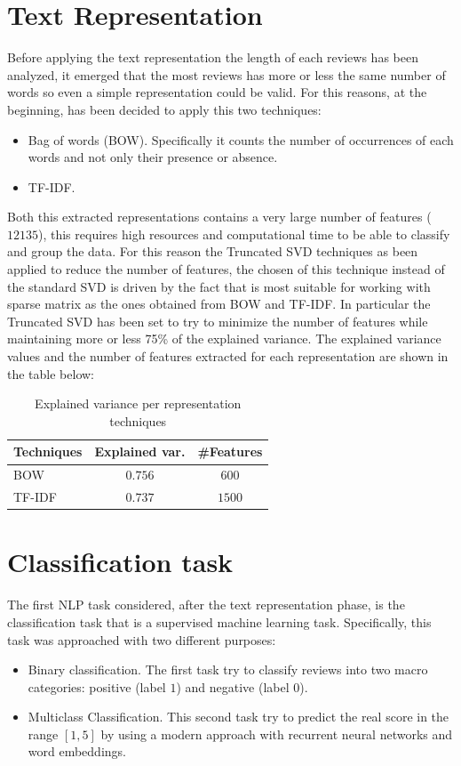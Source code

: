 \documentclass[11pt]{article}
\begin{document}
\section{Text Representation}
Before applying the text representation the length of each reviews has been analyzed, it emerged that the most reviews has more or less the same number of words so even a simple representation could be valid. For this reasons, at the beginning, has been decided to apply this two techniques:
\begin{itemize}
    \item Bag of words (BOW). Specifically it counts the number of occurrences of each words and not only their presence or absence.
    \item TF-IDF. 
\end{itemize}
Both this extracted representations contains a very large number of features ($12135$), this requires high resources and computational time to be able to classify and group the data. For this reason the Truncated SVD techniques as been applied to reduce the number of features, the chosen of this technique instead of the standard SVD is driven by the fact that is most suitable for working with sparse matrix as the ones obtained from BOW and TF-IDF. In particular the Truncated SVD has been set to try to minimize the number of features while maintaining more or less 75\% of the explained variance.
The explained variance values and the number of features extracted for each representation are shown in the table below:
\begin{table}[H]
    \begin{center}
        \begin{tabular}{||l||c|c||}
            \hline
            Techniques & Explained var. & \#Features\\
            \hline
            \hline
            BOW & $0.756$ & $600$\\
            \hline
            TF-IDF & $0.737$ & $1500$\\
            \hline
        \end{tabular}
    \caption{Explained variance per representation techniques}
    \end{center}
\end{table}


\section{Classification task}
The first NLP task considered, after the text representation phase, is the classification task that is a supervised machine learning task. Specifically, this task was approached with two different purposes: 
\begin{itemize}
    \item Binary classification. The first task try to classify reviews into two macro categories: positive (label $1$) and negative (label $0$).
    \item Multiclass Classification. This second task try to predict the real score in the range $[1,5]$ by using a modern approach with recurrent neural networks and word embeddings.
\end{itemize}
\end{document}
